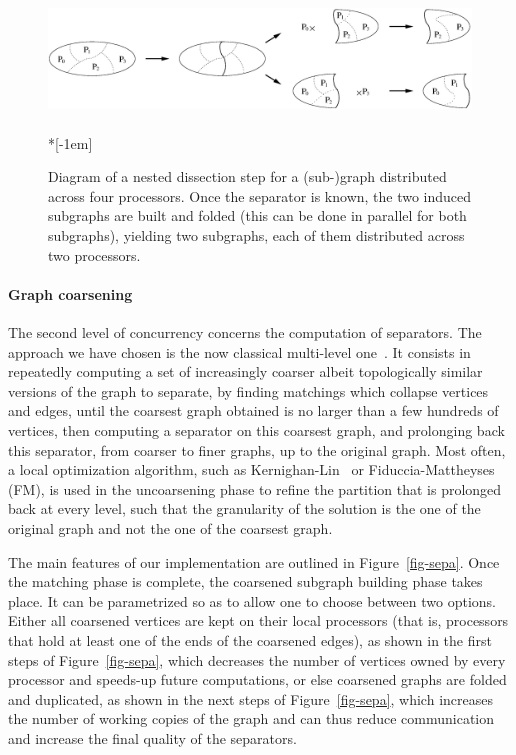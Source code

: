 \begin{figure}
~\hfill%
\includegraphics[scale=0.38]{p_f_nedi.eps}
\hfill~\\*[-1em]
\caption{Diagram of a nested dissection step for a (sub-)graph
  distributed across four processors. Once the separator is known, the
  two induced subgraphs are built and folded (this can be done in
  parallel for both subgraphs), yielding two subgraphs, each of them
  distributed across two processors.}
\label{fig-nedi}
\end{figure}

\paragraph{Graph coarsening}
\label{secalgocoarsen}

The second level of concurrency concerns the computation of
separators. The approach we have chosen is the now classical
multi-level one~\cite{basi94,hele95,kaku98a}. It consists in
repeatedly computing a set of increasingly coarser albeit
topologically similar versions of the
graph to separate, by finding matchings which collapse vertices and
edges, until the coarsest graph obtained is no larger than a few
hundreds of vertices, then computing a separator on this coarsest
graph, and prolonging back this separator, from coarser to finer
graphs, up to the original graph.
Most often, a local optimization algorithm, such as
Kernighan-Lin~\cite{keli70} or Fiduccia-Mattheyses~\cite{fima82} (FM), is
used in the uncoarsening phase to refine the partition that is
prolonged back at every level, such that the granularity of the
solution is the one of the original graph and not the one of the
coarsest graph.

The main features of our implementation are outlined in
Figure~\ref{fig-sepa}. Once the matching phase is complete, the
coarsened subgraph building phase takes place. It can be
parametrized so as to allow one to choose between two options. Either
all coarsened vertices are kept on their local processors (that is,
processors that hold at least one of the ends of the coarsened edges),
as shown in the first steps of Figure~\ref{fig-sepa}, which decreases
the number of vertices owned by every processor and speeds-up future
computations, or else coarsened graphs are folded and duplicated, as
shown in the next steps of Figure~\ref{fig-sepa}, which increases the
number of working copies of the graph and can thus reduce
communication and increase the final quality of the separators.

